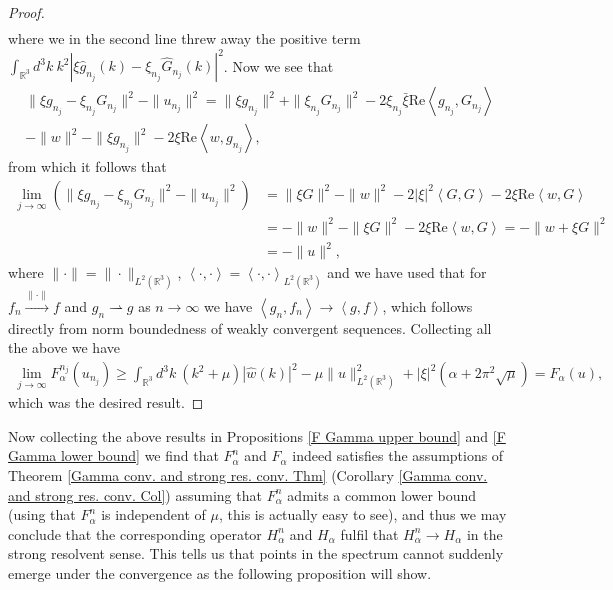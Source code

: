\documentclass[a4paper,11pt]{article}
\newcommand{\Real}{\text{Re}}
\renewcommand{\braket}[1]{\left\langle#1\right\rangle}
\newcommand{\R}{\mathbb{R}}
\numberwithin{equation}{section}
\begin{document}
\begin{proof}
\begin{equation}
\begin{aligned}
\end{aligned}
\end{equation}
where we in the second line threw away the positive term $ \int_{\R^3} d^3k\ k^2|\xi \hat{g}_{n_j}(k)-\xi_{n_j}\hat{G}_{n_j}(k)|^2 $. Now we see that \begin{equation}
\begin{aligned}
\|\xi g_{n_j}-\xi_{n_j}G_{n_j}\|^2-\|u_{n_j}\|^2=\|\xi g_{n_j}\|^2+\|\xi_{n_j}G_{n_j}\|^2-2\xi_{n_j}\bar{\xi}\Real\braket{g_{n_j},G_{n_j}}\\-\|w\|^2-\|\xi g_{n_j}\|^2-2\xi\Real\braket{w,g_{n_j}},
\end{aligned}
\end{equation}
from which it follows that\begin{equation}
\begin{aligned}
\lim\limits_{j\to\infty}\left(\|\xi g_{n_j}-\xi_{n_j}G_{n_j}\|^2-\|u_{n_j}\|^2\right)&=\|\xi G\|^2-\|w\|^2-2|\xi|^2\braket{G,G}-2\xi\Real\braket{w,G}\\&=-\|w\|^2-\|\xi G\|^2-2\xi\Real\braket{w,G}=-\|w+\xi G\|^2\\&=-\|u\|^2,
\end{aligned}
\end{equation}
where $ \|\cdot\|=\|\cdot\|_{L^2(\R^3)} $, $ \braket{\cdot,\cdot}=\braket{\cdot,\cdot}_{L^2(\R^3)} $ and we have used that for $ f_n\xrightarrow{\|\cdot\|}f $ and $ g_n\rightharpoonup g $ as $ n\to\infty $ we have $ \braket{g_n,f_n}\to\braket{g,f} $, which follows directly from norm boundedness of weakly convergent sequences. Collecting all the above we have \begin{equation}
\begin{aligned}
\lim\limits_{j\to\infty}F_\alpha^{n_j}(u_{n_j})\geq \int_{\R^3} d^3k\ \left(k^2+\mu\right)|\hat{w}(k)|^2-\mu\|u\|^2_{L^2(\R^3)}+|\xi|^2\left(\alpha+2\pi^2\sqrt{\mu}\right)=F_\alpha(u),
\end{aligned}
\end{equation}
which was the desired result.
\end{proof}
Now collecting the above results in Propositions \ref{F Gamma upper bound} and \ref{F Gamma lower bound} we find that $ F_\alpha^n $ and $ F_\alpha $ indeed satisfies the assumptions of Theorem \ref{Gamma conv. and strong res. conv. Thm} (Corollary \ref{Gamma conv. and strong res. conv. Col}) assuming that $ F_\alpha^n $ admits a common lower bound (using that $ F_\alpha^n $ is independent of $ \mu $, this is actually easy to see), and thus we may conclude that the corresponding operator $ H_\alpha^n $ and $ H_\alpha $ fulfil that $ H_\alpha^n\to H_\alpha $ in the strong resolvent sense. This tells us that points in the spectrum cannot suddenly emerge under the convergence as the following proposition will show.
\end{document}

